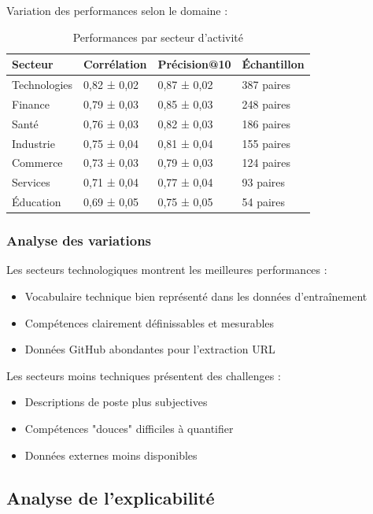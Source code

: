 \documentclass[12pt,a4paper]{report}
\begin{document}
Variation des performances selon le domaine :

\begin{table}[H]
\centering
\caption{Performances par secteur d'activité}
\label{tab:performances-secteurs}
\begin{tabular}{@{}llll@{}}
\toprule
Secteur & Corrélation & Précision@10 & Échantillon \\
\midrule
Technologies & 0,82 ± 0,02 & 0,87 ± 0,02 & 387 paires \\
Finance & 0,79 ± 0,03 & 0,85 ± 0,03 & 248 paires \\
Santé & 0,76 ± 0,03 & 0,82 ± 0,03 & 186 paires \\
Industrie & 0,75 ± 0,04 & 0,81 ± 0,04 & 155 paires \\
Commerce & 0,73 ± 0,03 & 0,79 ± 0,03 & 124 paires \\
Services & 0,71 ± 0,04 & 0,77 ± 0,04 & 93 paires \\
Éducation & 0,69 ± 0,05 & 0,75 ± 0,05 & 54 paires \\
\bottomrule
\end{tabular}
\end{table}

\subsubsection{Analyse des variations}

Les secteurs technologiques montrent les meilleures performances :
\begin{itemize}
\item Vocabulaire technique bien représenté dans les données d'entraînement
\item Compétences clairement définissables et mesurables
\item Données GitHub abondantes pour l'extraction URL
\end{itemize}

Les secteurs moins techniques présentent des challenges :
\begin{itemize}
\item Descriptions de poste plus subjectives
\item Compétences "douces" difficiles à quantifier
\item Données externes moins disponibles
\end{itemize}

\subsection{Analyse de l'explicabilité}
\end{document}
